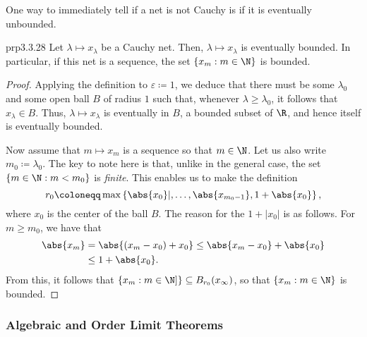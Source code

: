 One way to immediately tell if a net is not Cauchy is if it is eventually unbounded. 
\begin{prp}{}{prp3.3.28}
Let $\lambda \mapsto x_\lambda$ be a Cauchy net.  Then, $\lambda \mapsto x_\lambda$ is eventually bounded.  In particular, if this net is a sequence, the set $\left\{ x_m :m\in \N \right\}$ is bounded.
\begin{proof}
Applying the definition to $\varepsilon \coloneqq 1$, we deduce that there must be some $\lambda _0$ and some open ball $B$ of radius $1$ such that, whenever $\lambda \geq \lambda _0$, it follows that $x_\lambda \in B$.  Thus, $\lambda \mapsto x_\lambda$ is eventually in $B$, a bounded subset of $\R$, and hence itself is eventually bounded.

Now assume that $m\mapsto x_m$ is a sequence so that $m\in \N$.  Let us also write $m_0\coloneqq \lambda _0$.  The key to note here is that, unlike in the general case, the set $\{ m\in \N :m<m_0\}$ is \emph{finite}.  This enables us to make the definition
\begin{equation}
r_0\coloneqq \max \left\{ \abs{x_0}|,\ldots ,\abs{x_{m_0-1}},1+\abs{x_0}\right\} ,
\end{equation}
where $x_0$ is the center of the ball $B$.  The reason for the $1+|x_0|$ is as follows.  For $m\geq m_0$, we have that
\begin{equation}
\begin{split}
\abs{x_m} & =\abs{(x_m-x_0)+x_0}\leq \abs{x_m-x_0}+\abs{x_0} \\
& \leq 1+\abs{x_0}.
\end{split}
\end{equation}
From this, it follows that $\left\{ x_m:m\in \N ]\right\} \subseteq B_{r_0}(x_\infty)$, so that $\left\{ x_m:m\in \N \right\}$ is bounded.
\end{proof}
\end{prp}

\subsubsection{Algebraic and Order Limit Theorems}

